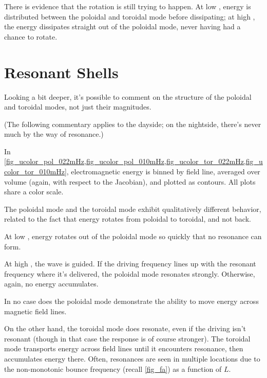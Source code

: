 There is evidence that the rotation is still trying to happen. At low \azm, energy is distributed between the poloidal and toroidal mode before dissipating; at high \azm, the energy dissipates straight out of the poloidal mode, never having had a chance to rotate. 

\section{Resonant Shells}
  \label{sec_shells}

Looking a bit deeper, it's possible to comment on the structure of the poloidal and toroidal modes, not just their magnitudes. 

(The following commentary applies to the dayside; on the nightside, there's never much by the way of resonance.)

In \cref{fig_ucolor_pol_022mHz,fig_ucolor_pol_010mHz,fig_ucolor_tor_022mHz,fig_ucolor_tor_010mHz}, electromagnetic energy is binned by field line, averaged over volume (again, with respect to the Jacobian), and plotted as contours. All plots share a color scale. 

The poloidal mode and the toroidal mode exhibit qualitatively different behavior, related to the fact that energy rotates from poloidal to toroidal, and not back. 

At low \azm, energy rotates out of the poloidal mode so quickly that no resonance can form. 

At high \azm, the \Alfven wave is guided. If the driving frequency lines up with the resonant frequency where it's delivered, the poloidal mode resonates strongly. Otherwise, again, no energy accumulates. 

In no case does the poloidal mode demonstrate the ability to move energy across magnetic field lines. 

On the other hand, the toroidal mode does resonate, even if the driving isn't resonant (though in that case the response is of course stronger). The toroidal mode transports energy across field lines until it encounters resonance, then accumulates energy there. Often, resonances are seen in multiple locations due to the non-monotonic \Alfven bounce frequency (recall \cref{fig_fa}) as a function of $L$. 


